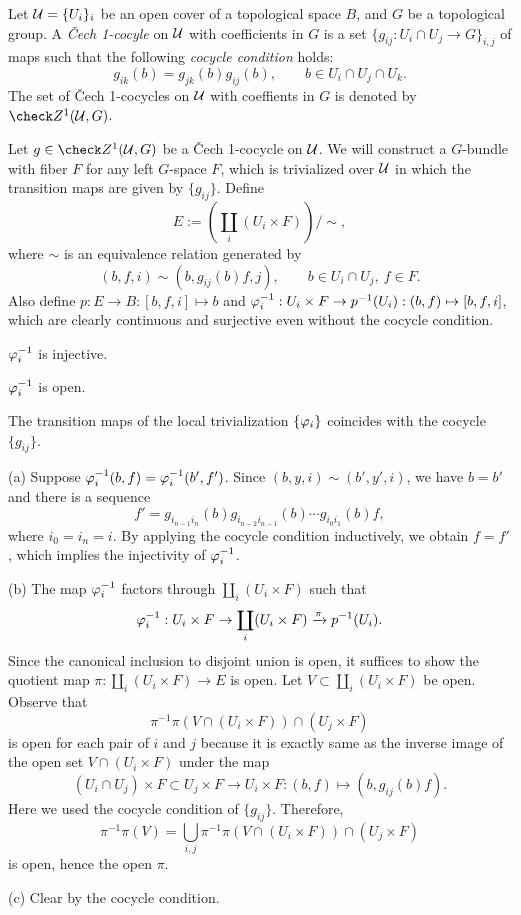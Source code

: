 \documentclass{../../large}
\begin{document}
\begin{prb}
Let $\mathcal{U}=\{U_i\}_i$ be an open cover of a topological space $B$, and $G$ be a topological group.
A \emph{\v Cech 1-cocyle} on $\mathcal{U}$ with coefficients in $G$ is a set $\{g_{ij}:U_i\cap U_j\to G\}_{i,j}$ of maps such that the following \emph{cocycle condition} holds:
\[g_{ik}(b)=g_{jk}(b)g_{ij}(b),\qquad b\in U_i\cap U_j\cap U_k.\]
The set of \v Cech 1-cocycles on $\mathcal{U}$ with coeffients in $G$ is denoted by $\check Z^1(\cU,G)$.

Let $g\in\check Z^1(\cU,G)$ be a \v Cech 1-cocycle on $\mathcal{U}$.
We will construct a $G$-bundle with fiber $F$ for any left $G$-space $F$, which is trivialized over $\mathcal{U}$ in which the transition maps are given by $\{g_{ij}\}$.
Define
\[E:=\left(\coprod_i(U_i\times F)\right)/\sim,\]
where $\sim$ is an equivalence relation generated by
\[(b,f,i)\sim(b,g_{ij}(b)f,j),
\qquad b\in U_i\cap U_j,\ f\in F.\]
Also define $p:E\to B:[b,f,i]\mapsto b$ and $\varphi_i^{-1}:U_i\times F\to p^{-1}(U_i):(b,f)\mapsto[b,f,i]$, which are clearly continuous and surjective even without the cocycle condition.
\begin{parts}
\item $\varphi_i^{-1}$ is injective.
\item $\varphi_i^{-1}$ is open.
\item The transition maps of the local trivialization $\{\varphi_i\}$ coincides with the cocycle $\{g_{ij}\}$.
\end{parts}
\end{prb}
\begin{pf}
(a)
Suppose $\varphi_i^{-1}(b,f)=\varphi_i^{-1}(b',f')$.
Since $(b,y,i)\sim(b',y',i)$, we have $b=b'$ and there is a sequence
\[f'=g_{i_{n-1}i_n}(b)g_{i_{n-2}i_{n-1}}(b)\cdots g_{i_0i_1}(b)f,\]
where $i_0=i_n=i$.
By applying the cocycle condition inductively, we obtain $f=f'$, which implies the injectivity of $\varphi_i^{-1}$.

(b)
The map $\varphi_i^{-1}$ factors through $\coprod_i(U_i\times F)$ such that
\[\varphi_i^{-1}:U_i\times F\to\coprod_i(U_i\times F)\xrightarrow{\pi}p^{-1}(U_i).\]
Since the canonical inclusion to disjoint union is open, it suffices to show the quotient map $\pi:\coprod_i(U_i\times F)\to E$ is open.
Let $V\subset\coprod_i(U_i\times F)$ be open.
Observe that
\[\pi^{-1}\pi(V\cap(U_i\times F))\cap(U_j\times F)\]
is open for each pair of $i$ and $j$ because it is exactly same as the inverse image of the open set $V\cap(U_i\times F)$ under the map
\[(U_i\cap U_j)\times F\subset U_j\times F\to U_i\times F:(b,f)\mapsto(b,g_{ij}(b)f).\]
Here we used the cocycle condition of $\{g_{ij}\}$.
Therefore,
\[\pi^{-1}\pi(V)=\bigcup_{i,j}\pi^{-1}\pi(V\cap(U_i\times F))\cap(U_j\times F)\]
is open, hence the open $\pi$.

(c)
Clear by the cocycle condition.
\end{pf}
\end{document}

